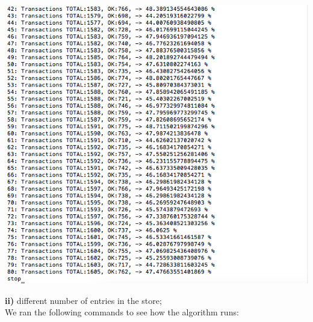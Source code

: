 \documentclass[a4paper, 11pt]{article}
\begin{document}
\begin{itemize}
\includegraphics[scale=0.4]{images/exp-i-6b.png} \\
\end{itemize}
%
\newpage
\textbf{ii)} different number of entries in the store;\\
We ran the following commands to see how the algorithm runs:\\
\end{document}
